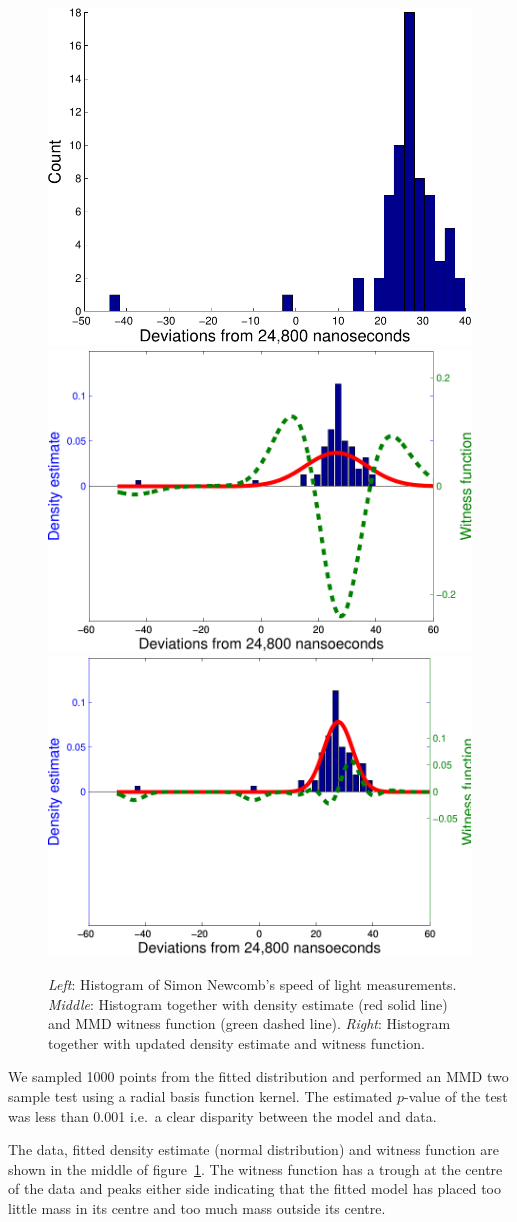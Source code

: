\documentclass{article} %
\def\ie{i.e.\ }
\begin{document}
\begin{figure}[ht]
\centering
\includegraphics[width=0.29\columnwidth]{figures/newcomb_hist}
\includegraphics[width=0.32\columnwidth]{figures/newcomb_witness_1}
\includegraphics[width=0.32\columnwidth]{figures/newcomb_witness_2}
\caption{
\emph{Left}: Histogram of Simon Newcomb's speed of light measurements.
\emph{Middle}: Histogram together with density estimate (red solid line) and MMD witness function (green dashed line).
\emph{Right}: Histogram together with updated density estimate and witness function.
}
\label{fig:newcomb}
\end{figure}

We sampled 1000 points from the fitted distribution and performed an MMD two sample test using a radial basis function kernel\footnotemark.
The estimated $p$-value of the test was less than 0.001 \ie a clear disparity between the model and data.

The data, fitted density estimate (normal distribution) and witness function are shown in the middle of figure~\ref{fig:newcomb}.
The witness function has a trough at the centre of the data and peaks either side indicating that the fitted model has placed too little mass in its centre and too much mass outside its centre.

\end{document}
